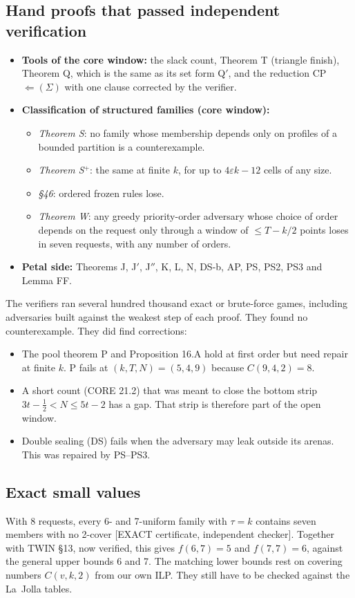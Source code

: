 \documentclass[11pt]{article}
\newcommand{\st}[1]{\textsf{\small[#1]}}
\begin{document}
\subsection{Hand proofs that passed independent verification}
\begin{itemize}
\item \textbf{Tools of the core window:} the slack count, Theorem T (triangle finish), Theorem Q, which is the same as
its set form Q$'$, and the reduction CP~$\Leftarrow(\Sigma)$ with one clause corrected by the verifier.
\item \textbf{Classification of structured families (core window):}
 \begin{itemize}
 \item \emph{Theorem S}: no family whose membership depends only on profiles of a bounded partition is a
 counterexample.
 \item \emph{Theorem S$^+$}: the same at finite $k$, for up to $4\varepsilon k-12$ cells of any size.
 \item \emph{\S46}: ordered frozen rules lose.
 \item \emph{Theorem W}: any greedy priority-order adversary whose choice of order depends on the request only through
 a window of $\le T-k/2$ points loses in seven requests, with any number of orders.
 \end{itemize}
\item \textbf{Petal side:} Theorems J, J$'$, J$''$, K, L, N, DS-b, AP, PS, PS2, PS3 and Lemma FF.
\end{itemize}
The verifiers ran several hundred thousand exact or brute-force games, including adversaries built against the
weakest step of each proof. They found no counterexample. They did find corrections:
\begin{itemize}
\item The pool theorem P and Proposition 16.A hold at first order but need repair at finite $k$. P fails at
$(k,T,N)=(5,4,9)$ because $C(9,4,2)=8$.
\item A short count (CORE 21.2) that was meant to close the bottom strip $3t-\tfrac12<N\le 5t-2$ has a gap. That strip
is therefore part of the open window.
\item Double sealing (DS) fails when the adversary may leak outside its arenas. This was repaired by PS--PS3.
\end{itemize}

\subsection{Exact small values}
With 8 requests, every 6- and 7-uniform family with $\tau=k$ contains seven members with no 2-cover
\st{EXACT certificate, independent checker}. Together with TWIN \S13, now verified, this gives $f(6,7)=5$ and
$f(7,7)=6$, against the general upper bounds 6 and 7. The matching lower bounds rest on covering numbers $C(v,k,2)$
from our own ILP. They still have to be checked against the La~Jolla tables.
\end{document}
